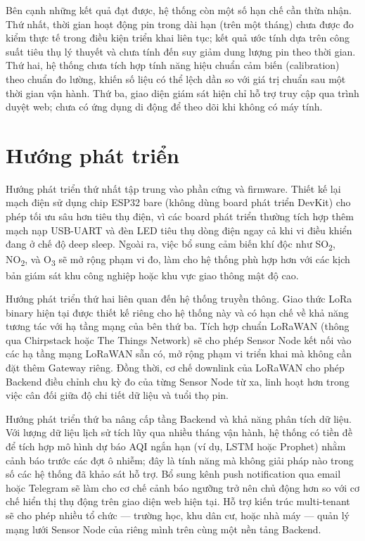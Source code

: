 \documentclass[../DoAn.tex]{subfiles}
\begin{document}
Bên cạnh những kết quả đạt được, hệ thống còn một số hạn chế cần thừa nhận. Thứ nhất, thời gian hoạt động pin trong dài hạn (trên một tháng) chưa được đo kiểm thực tế trong điều kiện triển khai liên tục; kết quả ước tính dựa trên công suất tiêu thụ lý thuyết và chưa tính đến suy giảm dung lượng pin theo thời gian. Thứ hai, hệ thống chưa tích hợp tính năng hiệu chuẩn cảm biến (calibration) theo chuẩn đo lường, khiến số liệu có thể lệch dần so với giá trị chuẩn sau một thời gian vận hành. Thứ ba, giao diện giám sát hiện chỉ hỗ trợ truy cập qua trình duyệt web; chưa có ứng dụng di động để theo dõi khi không có máy tính.

\section{Hướng phát triển}
\label{section:6.2}

Hướng phát triển thứ nhất tập trung vào phần cứng và firmware. Thiết kế lại mạch điện sử dụng chip ESP32 bare (không dùng board phát triển DevKit) cho phép tối ưu sâu hơn tiêu thụ điện, vì các board phát triển thường tích hợp thêm mạch nạp USB-UART và đèn LED tiêu thụ dòng điện ngay cả khi vi điều khiển đang ở chế độ deep sleep. Ngoài ra, việc bổ sung cảm biến khí độc như SO\textsubscript{2}, NO\textsubscript{2}, và O\textsubscript{3} sẽ mở rộng phạm vi đo, làm cho hệ thống phù hợp hơn với các kịch bản giám sát khu công nghiệp hoặc khu vực giao thông mật độ cao.

Hướng phát triển thứ hai liên quan đến hệ thống truyền thông. Giao thức LoRa binary hiện tại được thiết kế riêng cho hệ thống này và có hạn chế về khả năng tương tác với hạ tầng mạng của bên thứ ba. Tích hợp chuẩn \gls{LoRaWAN} (thông qua Chirpstack hoặc The Things Network) sẽ cho phép Sensor Node kết nối vào các hạ tầng mạng LoRaWAN sẵn có, mở rộng phạm vi triển khai mà không cần đặt thêm Gateway riêng. Đồng thời, cơ chế downlink của LoRaWAN cho phép Backend điều chỉnh chu kỳ đo của từng Sensor Node từ xa, linh hoạt hơn trong việc cân đối giữa độ chi tiết dữ liệu và tuổi thọ pin.

Hướng phát triển thứ ba nâng cấp tầng Backend và khả năng phân tích dữ liệu. Với lượng dữ liệu lịch sử tích lũy qua nhiều tháng vận hành, hệ thống có tiền đề để tích hợp mô hình dự báo \gls{AQI} ngắn hạn (ví dụ, LSTM hoặc Prophet) nhằm cảnh báo trước các đợt ô nhiễm; đây là tính năng mà không giải pháp nào trong số các hệ thống đã khảo sát hỗ trợ. Bổ sung kênh push notification qua email hoặc Telegram sẽ làm cho cơ chế cảnh báo ngưỡng trở nên chủ động hơn so với cơ chế hiển thị thụ động trên giao diện web hiện tại. Hỗ trợ kiến trúc multi-tenant sẽ cho phép nhiều tổ chức — trường học, khu dân cư, hoặc nhà máy — quản lý mạng lưới Sensor Node của riêng mình trên cùng một nền tảng Backend.
\end{document}
